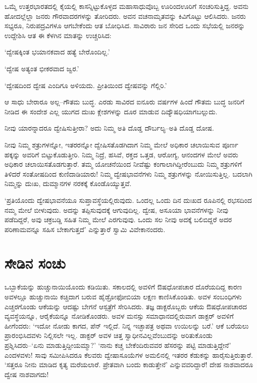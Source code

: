 \newpage

ಒಮ್ಮೆ ಉತ್ತರಭಾರತದಲ್ಲಿ ಕೈಯಲ್ಲಿ ಕಾಸನ್ನಿಟ್ಟುಕೊಳ್ಳದ ಮಹಾಸಾಧುವೊಬ್ಬ ಊರಿಂದ\break ಊರಿಗೆ ಸಂಚರಿಸುತ್ತಿದ್ದ. ಅವನು ಹೋದಲ್ಲೆಲ್ಲಾ ಜನರು ಗೌರವಾದರಗಳನ್ನು ತೋರಿದರು. ಅವನ ವಚನಾಮೃತವನ್ನು ಕಿವಿಗೊಟ್ಟು ಆಲಿಸಿದರು. ಜನರು ಸಭ್ಯರೂ, ನಿರುಪದ್ರವಿಗಳೂ ಆಗಬೇಕೆಂದು ಆತ ಬೋಧಿಸಿದ. ಸಾವಿರಾರು ಜನ ಸೇರಿದ ಒಂದು ಸಭೆಯಲ್ಲಿ ಜನರನ್ನು ಉದ್ದೇಶಿಸಿ ಆತ ಈ ಕೆಳಗಿನ ಮಾತನ್ನು ಉಚ್ಚರಿಸಿದ:

‘ದ್ವೇಷಕ್ಕಿಂತ ಭಯಾನಕವಾದ ಹತ್ಯೆ ಬೇರೊಂದಿಲ್ಲ.’

‘ದ್ವೇಷ ಅತ್ಯಂತ ಭೀಕರವಾದ ಜ್ವರ.’

‘ದ್ವೇಷದಿಂದ ದ್ವೇಷ ಎಂದಿಗೂ ಅಳಿಯದು. ಪ್ರೀತಿಯಿಂದ ದ್ವೇಷವನ್ನು ಗೆಲ್ಲಿರಿ.’

ಆ ಸಾಧು ಬೇರಾರೂ ಅಲ್ಲ–ಗೌತಮ ಬುದ್ಧ. ಎರಡು ಸಾವಿರದ ಐನೂರು ವರ್ಷಗಳ ಹಿಂದೆ ಗೌತಮ ಬುದ್ಧ ಜನರಿಗೆ ನೀಡಿದ ಈ ಸಂದೇಶ ಎಲ್ಲ ಯುಗದ ದುಃಖ ಕ್ಲೇಶಗಳನ್ನು ದೂರ ಮಾಡುವ ದಿವ್ಯೌಷಧಿಯಾಗಬಲ್ಲುದು.

ನೀವು ಯಾರನ್ನಾದರೂ ದ್ವೇಷಿಸುತ್ತೀರಾ? ಅದು ನಿಮ್ಮ ಅತಿ ದೊಡ್ಡ ದೌರ್ಬಲ್ಯ–ಅತಿ ದೊಡ್ಡ ದೋಷ.

ನೀವು ನಿಮ್ಮ ಶತ್ರುಗಳನ್ನೋ, ಇತರರನ್ನೋ ದ್ವೇಷಿಸತೊಡಗಿದಾಗ ನಿಮ್ಮ ಮೇಲೆ ಅಧಿಕಾರ ಚಲಾಯಿಸುವ ಪೂರ್ಣ ಹಕ್ಕನ್ನು ಅವರಿಗೆ ಬಿಟ್ಟುಕೊಡುತ್ತೀರಿ. ನಿಮ್ಮ ನಿದ್ರೆ, ಹಸಿವೆ, ರಕ್ತದ ಒತ್ತಡ, ಆರೋಗ್ಯ, ಆನಂದಗಳ ಮೇಲೆ ಅವರು ಅಧಿಕಾರ ಚಲಾಯಿಸತೊಡಗುತ್ತಾರೆ. ತಮ್ಮ ಯೋಚನೆಯಿಂದ ನೀವೆಷ್ಟು ಕಂಗಾಲಾಗಿದ್ದೀರೆಂಬುದು ನಿಮ್ಮ ಶತ್ರುಗಳಿಗೆ ತಿಳಿದರೆ ಸಂತೋಷದಿಂದ ಕುಣಿದಾಡಿಯಾರು! ನಿಮ್ಮ ದ್ವೇಷಭಾವನೆಗಳು ನಿಮ್ಮ ಶತ್ರುಗಳನ್ನು ನೋಯಿಸುತ್ತಿಲ್ಲ. ಬದಲಾಗಿ ನಿಮ್ಮನ್ನು ದುಃಖ, ದುಮ್ಮಾನಗಳ ನರಕಕ್ಕೆ ಕೊಂಡೊಯ್ಯುತ್ತವೆ.

‘ಪ್ರತಿಯೊಂದು ದ್ವೇಷಭಾವನೆಯೂ ಸುಪ್ತಾವಸ್ಥೆಯಲ್ಲಿರುವುದು. ಒಂದಲ್ಲ ಒಂದು ದಿನ ದುಃಖದ ರೂಪಿನಲ್ಲಿ ರಭಸದಿಂದ ನಮ್ಮ ಮೇಲೆ ಬೀಳುವುದು. ಅದನ್ನು ತಪ್ಪಿಸುವುದಕ್ಕೆ ಆಗುವುದಿಲ್ಲ. ದ್ವೇಷ, ಅಸೂಯಾ ಭಾವನೆಗಳನ್ನು ನೀವು ಪಡೆದಿದ್ದರೆ, ಅವು ಚಕ್ರಬಡ್ಡಿ ಸಹಿತ ನಿಮ್ಮ ಮೇಲೆ ಎರಗುವುವು. ಒಂದು ಸಲ ನೀವು ಅದಕ್ಕೆ ಬಲಿಬಿದ್ದರೆ ಅದರ ಪರಿಣಾಮವನ್ನೂ ಸಹಿಸ ಬೇಕಾಗುತ್ತದೆ’ ಎನ್ನುತ್ತಾರೆ ಸ್ವಾಮಿ ವಿವೇಕಾನಂದರು.


\section*{ಸೇಡಿನ ಸಂಚು}


ಒಬ್ಬಾಕೆಯನ್ನು ಹುಚ್ಚುನಾಯಿಯೊಂದು ಕಡಿಯಿತು. ಸಕಾಲದಲ್ಲಿ ಅವಳಿಗೆ ಔಷಧೋಪಚಾರ ದೊರೆಯದಿದ್ದ ಕಾರಣ ಅವಳಲ್ಲೂ ಹುಚ್ಚುನಾಯಿ ಕಚ್ಚಿದಾಗ ಬರುವ ಹೈಡ್ರೋಫೋಬಿಯಾ ಲಕ್ಷಣ ಕಾಣಿಸಿಕೊಂಡಿತು. ಅವಳ ಸಂಬಂಧಿಗಳು ಎಚ್ಚರಗೊಂಡು ಆಕೆಯನ್ನು ಆದಷ್ಟು ಬೇಗನೆ ಆಸ್ಪತ್ರೆಗೆ ಸೇರಿಸಿದರು. ತಜ್ಞ ಡಾಕ್ಟರೊಬ್ಬರು ಆಕೆಯ ಔಷಧೋಪಚಾರದ ವ್ಯವಸ್ಥೆಯನ್ನೂ, ಆರೈಕೆಯನ್ನೂ ನೋಡಿಕೊಂಡರು. ಅವಳ ಮನಸ್ಸು ಸಮಾಧಾನದಲ್ಲಿರುವಾಗ ಡಾಕ್ಟರ್ ಅವಳಿಗೆ ಹೀಗೆಂದರು: ‘ಇದೋ ನೋಡು ಕಾಗದ, ಪೆನ್ ಇಲ್ಲಿದೆ. ನಿನ್ನ ಇಚ್ಛಾಪತ್ರ ಅಥವಾ ಉಯಿಲನ್ನು ಬರೆ.’ ಆಕೆ ಬರೆಯಲು ಪ್ರಾರಂಭಿಸಿದವಳು ನಿಲ್ಲಿಸಲೇ ಇಲ್ಲ. ಡಾಕ್ಟರ್ ಅವಳ ಚಿತ್ತ ಸ್ವಾಧೀನವಿಲ್ಲವೆಂಬುದನ್ನು ಅರಿತುಕೊಂಡು ಪ್ರಶ್ನಿಸಿದರು–‘ಏನು ಮಾಡುತ್ತಿದ್ದೀಯಮ್ಮಾ?’ ‘ನಾನು ಕಚ್ಚ ಬೇಕೆಂದಿರುವವರ ಹೆಸರನ್ನು ಪಟ್ಟಿ ಮಾಡುತ್ತಿದ್ದೇನೆ’ ಎಂದಳವಳು! ಸಾವು ಸಮೀಪಿಸಿದರೂ ಕೆಲವರು ದ್ವೇಷಾಸೂಯೆಗಳ ಅಮಲಿನಲ್ಲಿ ಇತರರ ಕೆಡುಕನ್ನು ಹಾರೈಸುತ್ತಿರುತ್ತಾರೆ. ‘ಸತ್ತರೂ ನೀನು ಮಾಡಿದ ಕೃತ್ಯ ಮರೆಯಲಾರೆ. ಪ್ರೇತವಾಗಿ ಬಂದು ಕಾಡುತ್ತೇನೆ’ ಎನ್ನುವವರಿದ್ದಾರೆ! ದೇಹ ನಾಶವಾದರೂ ದ್ವೇಷ ನಾಶವಾಗದು!


